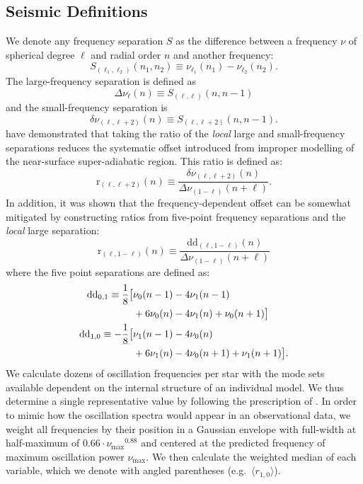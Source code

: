 \subsection{Seismic Definitions} 
\label{sec:sdefs}
We denote any frequency separation $S$ as the difference between a frequency $\nu$ of spherical degree $\ell$ and radial order $n$ and another frequency: 
\begin{equation} 
  S_{(\ell_1, \ell_2)}(n_1, n_2) \equiv \nu_{\ell_1}(n_1) - \nu_{\ell_2}(n_2).
\end{equation}
The large-frequency separation is defined as
\begin{equation} 
  \Delta\nu_\ell(n) \equiv S_{(\ell, \ell)}(n, n-1)
\end{equation}
and the small-frequency separation is
\begin{equation}
  \delta\nu_{(\ell, \ell+2)}(n) \equiv S_{(\ell, \ell+2)}(n, n-1).
\end{equation}
\citet{2003A&A...411..215R} have demonstrated that taking the ratio of the \emph{local} large and small-frequency separations reduces the systematic offset introduced from improper modelling of the near-surface super-adiabatic region. This ratio is defined as: 
\begin{equation}    %
  \mathrm{r}_{(\ell,\ell +2)}(n) \equiv \frac{\delta\nu_{(\ell, \ell+2)}(n)}{\Delta\nu_{(1-\ell)}(n+\ell)}.
\end{equation}
In addition, it was shown that the frequency-dependent offset can be somewhat mitigated by constructing ratios from five-point frequency separations and the \emph{local} large separation:
\begin{equation} 
  \mathrm{r}_{(\ell, 1-\ell)}(n) \equiv \frac{\mathrm{dd}_{(\ell,1-\ell)}(n)}{\Delta\nu_{(1-\ell)}(n+\ell)} %
\end{equation}
where the five point separations are defined as:
\begin{align} 
  \mathrm{dd}_{0,1} \equiv \frac{1}{8} \big[&\nu_0(n-1) - 4\nu_1(n-1) \notag\\
                                 &+6\nu_0(n) - 4\nu_1(n) + \nu_0(n+1)\big]\\ 
  \mathrm{dd}_{1,0} \equiv -\frac{1}{8} \big[&\nu_1(n-1) - 4\nu_0(n) \notag\\
                                &+6\nu_1(n) - 4\nu_0(n+1) + \nu_1(n+1)\big]. \label{eqn:dlast}
\end{align}
We calculate dozens of oscillation frequencies per star with the mode sets available dependent on the internal structure of an individual model. We thus determine a single representative value 
by following the prescription of \citet{2012A&A...537A..30M}. In order to mimic how the oscillation spectra would appear in an observational data, we weight all frequencies by their position in a Gaussian envelope with  full-width at half-maximum of ${0.66\cdot\nu_{\max}{}^{0.88}}$ and centered at the predicted frequency of maximum oscillation power $\nu_{\max}$.  We then calculate the weighted median of each variable, which we denote with angled parentheses (e.g.\ ${\langle r_{1,0}\rangle}$).





